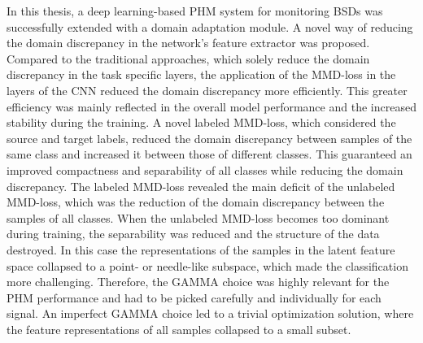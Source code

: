 In this thesis, a deep learning-based PHM system for monitoring BSDs was successfully extended with a domain adaptation module. A novel way of reducing the domain discrepancy in the network's feature extractor was proposed. Compared to the traditional approaches, which solely reduce the domain discrepancy in the task specific layers, the application of the MMD-loss in the layers of the CNN reduced the domain discrepancy more efficiently. This greater efficiency was mainly reflected in the overall model performance and the increased stability during the training. A novel labeled MMD-loss, which considered the source and target labels, reduced the domain discrepancy between samples of the same class and increased it between those of different classes. This guaranteed an improved compactness and separability of all classes while reducing the domain discrepancy. The labeled MMD-loss revealed the main deficit of the unlabeled MMD-loss, which was the reduction of the domain discrepancy between the samples of all classes. When the unlabeled MMD-loss becomes too dominant during training, the separability was reduced and the structure of the data destroyed. In this case the representations of the samples in the latent feature space collapsed to a point- or needle-like subspace, which made the classification more challenging. Therefore, the GAMMA choice was highly relevant for the PHM performance and had to be picked carefully and individually for each signal. An imperfect GAMMA choice led to a trivial optimization solution, where the feature representations of all samples collapsed to a small subset.
